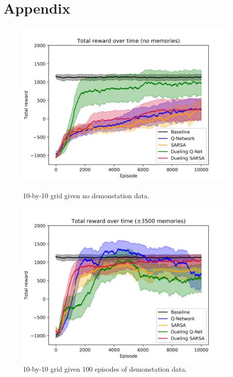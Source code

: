 \section{Appendix}\label{ap:appendix}
\begin{figure}[H]
    \centering
    \includegraphics[width=\linewidth]{img/results/10-sized/total_rewards_0m-min.png}
    \caption{10-by-10 grid given no demonstation data.}
    \label{fig:old-10sized-nomem}
    \includegraphics[width=\linewidth]{img/results/10-sized/total_rewards_100m-min.png}
    \caption{10-by-10 grid given 100 episodes of demonstation data.}
    \label{fig:old-10sized-100mem}

\end{figure}

